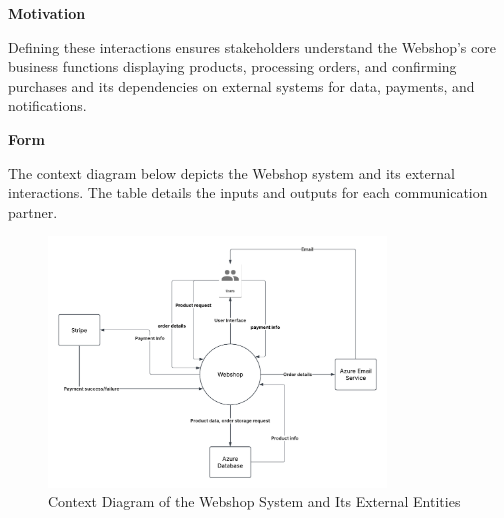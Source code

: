 \textbf{Motivation}

Defining these interactions ensures stakeholders understand the Webshop’s core business functions displaying products, processing orders, and confirming purchases and its dependencies on external systems for data, payments, and notifications.

\textbf{Form}

The context diagram below depicts the Webshop system and its external interactions. The table details the inputs and outputs for each communication partner.

\begin{figure}[h]
  \centering
  \includegraphics[width=0.8\textwidth]{images/webshop_context_diagram.pdf} 
  \caption{Context Diagram of the Webshop System and Its External Entities}
  \label{fig:webshop-context}
\end{figure}

\begin{table}[h]
  \centering
  \caption{Inputs and Outputs for Webshop Communication Partners}
  \label{tab:webshop-business-context}
\end{table}

